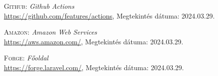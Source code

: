 \documentclass[
]{thesis-ekf}
\theoremstyle{definition}
\theoremstyle{remark}
\begin{document}
\begin{thebibliography}{47}
\textsc{Github}: \emph{Github Actions}
\\
\url{https://github.com/features/actions}, Megtekintés dátuma: 2024.03.29.

\textsc{Amazon}: \emph{Amazon Web Services}
\\
\url{https://aws.amazon.com/}, Megtekintés dátuma: 2024.03.29.

\textsc{Forge}: \emph{Főoldal}
\\
\url{https://forge.laravel.com/}, Megtekintés dátuma: 2024.03.29.


\end{thebibliography}


\end{document}
